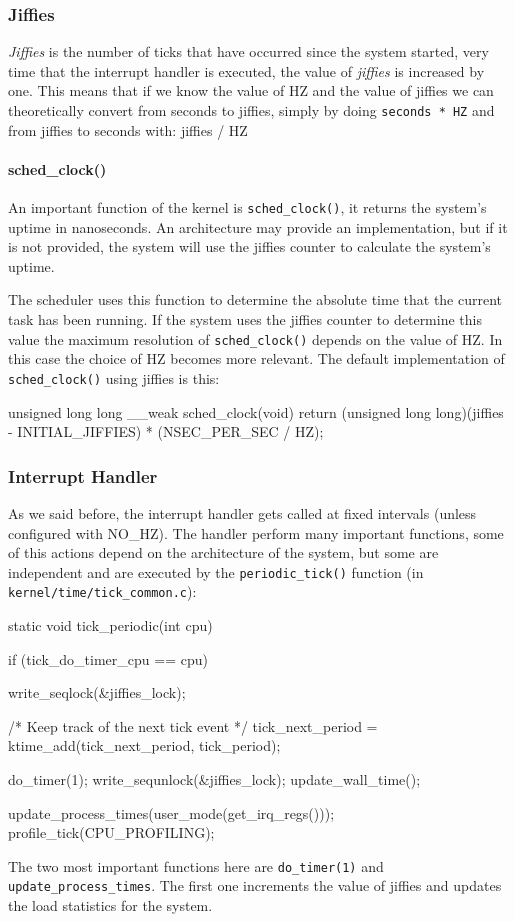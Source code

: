 \subsubsection{Jiffies}
\textit{Jiffies} is the number of ticks that have occurred since the system started, very time that the interrupt handler is executed, the value of \textit{jiffies} is increased by one. This means that if we know the value of HZ and the value of jiffies we can theoretically convert from seconds to jiffies, simply by doing \verb|seconds * HZ| and from jiffies to seconds with: jiffies / HZ

\paragraph{sched\_clock()}
\label{sched_clock}
An important function of the kernel is \verb|sched_clock()|, it returns the system's uptime in nanoseconds. An architecture may provide an implementation, but if it is not provided, the system will use the jiffies counter to calculate the system's uptime.

The scheduler uses this function to determine the absolute time that the current task has been running. If the system uses the jiffies counter to determine this value the maximum resolution of \verb|sched_clock()| depends on the value of HZ. In this case the choice of HZ becomes more relevant.
The default implementation of \verb|sched_clock()| using jiffies is this:
\begin{code}
unsigned long long __weak sched_clock(void)
{
	return (unsigned long long)(jiffies - INITIAL_JIFFIES)
					* (NSEC_PER_SEC / HZ);
}
\end{code}

\subsubsection{Interrupt Handler}

As we said before, the interrupt handler gets called at fixed intervals (unless configured with NO\_HZ). The handler perform many important functions, some of this actions depend on the architecture of the system, but some are independent and are executed by the \verb|periodic_tick()| function (in \verb|kernel/time/tick_common.c|):

\begin{code}
static void tick_periodic(int cpu)
{
	if (tick_do_timer_cpu == cpu) {
		write_seqlock(&jiffies_lock);

		/* Keep track of the next tick event */
		tick_next_period = ktime_add(tick_next_period, tick_period);

		do_timer(1);
		write_sequnlock(&jiffies_lock);
		update_wall_time();
	}

	update_process_times(user_mode(get_irq_regs()));
	profile_tick(CPU_PROFILING);
}
\end{code}
The two most important functions here are \verb|do_timer(1)| and \verb|update_process_times|. The first one increments the value of jiffies and updates the load statistics for the system.

